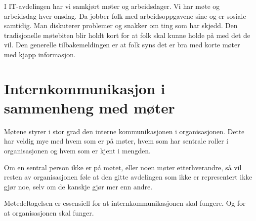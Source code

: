 \documentclass[12pt, a4paper]{article}
\begin{document}
I IT-avdelingen har vi samkjørt møter og arbeidsdager. Vi har møte og
arbeidsdag hver onsdag. Da jobber folk med arbeidsoppgavene sine og er sosiale
samtidig. Man diskuterer problemer og snakker om ting som har skjedd. Den
tradisjonelle møtebiten blir holdt kort for at folk skal kunne holde på med det
de vil. Den generelle tilbakemeldingen er at folk syns det er bra med korte
møter med kjapp informasjon. 

\section{Internkommunikasjon i sammenheng med møter}
Møtene styrer i stor grad den interne kommunikasjonen i organisasjonen. Dette
har veldig mye med hvem som er på møter, hvem som har sentrale roller i
organisasjonen og hvem som er kjent i mengden. 

Om en sentral person ikke er på møtet, eller noen møter etterhverandre, så vil
resten av organisasjonen føle at den gitte avdelingen som ikke er representert
ikke gjør noe, selv om de kanskje gjør mer enn andre. 

Møtedeltagelsen er essensiell for at internkommunikasjonen skal fungere. Og for
at organisasjonen skal funger.  
\end{document}
